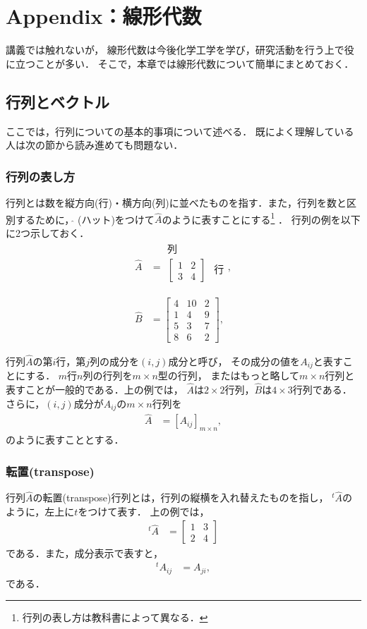 \setcounter{chapter}{4}
\chapter{Appendix：線形代数}
%
講義では触れないが，
線形代数は今後化学工学を学び，研究活動を行う上で役に立つことが多い．
そこで，本章では線形代数について簡単にまとめておく．
%
\section{行列とベクトル}
%
ここでは，行列についての基本的事項について述べる．
既によく理解している人は次の節から読み進めても問題ない．
%
\subsection{行列の表し方}
%
行列とは数を縦方向(行)・横方向(列)に並べたものを指す．また，行列を数と区別するために，$\hat{}$ (ハット)をつけて$\hat{A}$のように表すことにする\footnote{行列の表し方は教科書によって異なる．} ．
行列の例を以下に2つ示しておく．
\begin{align}
\hat{A} & =\begin{array}{cc}
\text{列}\\
\left[\begin{array}{cc}
1 & 2\\
3 & 4
\end{array}\right] & \text{行}\\
\\
\end{array},\\
\hat{B} &=\left[\begin{array}{ccc}
4 & 10 & 2\\
1 & 4 & 9\\
5 & 3 & 7\\
8 & 6 & 2
\end{array}\right], 
\end{align}

行列$\hat{A}$の第$i$行，第$j$列の成分を$(i,j)$成分と呼び，
その成分の値を$A_{ij}$と表すことにする．
$m$行$n$列の行列を$m\times n$型の行列，
またはもっと略して$m\times n$行列と表すことが一般的である．上の例では，
$\hat{A}$は$2\times 2$行列，$\hat{B}$は$4\times 3$行列である．
%
さらに，$(i,j)$成分が$A_{ij}$の$m\times n$行列を
\begin{align}
 \hat{A} & =\left[A_{ij}\right]_{m\times n},
\end{align}
のように表すこととする．
%
%
\subsection{転置(transpose)}
%
行列$\hat{A}$の転置(transpose)行列とは，行列の縦横を入れ替えたものを指し，
$^{t}\hat{A}$のように，左上に$t$をつけて表す．
上の例では，
\begin{align}
 ^{t}\hat{A} & =\left[\begin{array}{cc}
1 & 3\\
2 & 4
\end{array}\right] 
\end{align}
である．また，成分表示で表すと，
\begin{align}
^{t}A_{ij} & =A_{ji},
\end{align}
である．
%
